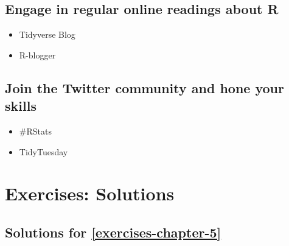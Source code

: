 \documentclass[
]{book}
\providecommand{\tightlist}{%
  \setlength{\itemsep}{0pt}\setlength{\parskip}{0pt}}
\begin{document}
\hypertarget{next-steps-online-readings}{%
\section{Engage in regular online readings about R}\label{next-steps-online-readings}}

\begin{itemize}
\tightlist
\item
  Tidyverse Blog
\item
  R-blogger
\end{itemize}

\hypertarget{next-steps-twitter}{%
\section{Join the Twitter community and hone your skills}\label{next-steps-twitter}}

\begin{itemize}
\tightlist
\item
  \#RStats
\item
  TidyTuesday
\end{itemize}

\hypertarget{exercises-solutions}{%
\chapter{Exercises: Solutions}\label{exercises-solutions}}

\hypertarget{exercises-solutions-5}{%
\section{Solutions for \ref{exercises-chapter-5}}\label{exercises-solutions-5}}
\end{document}
